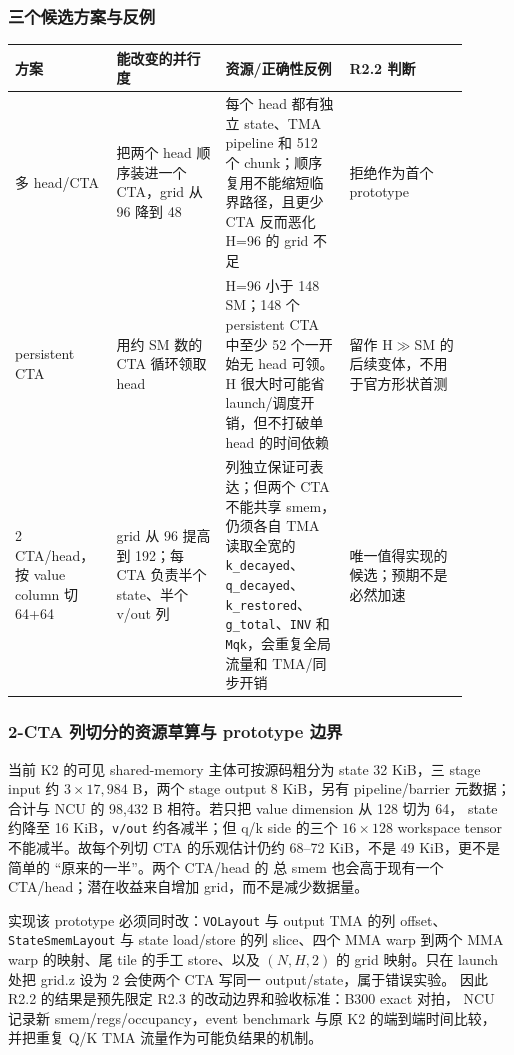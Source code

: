 \documentclass[11pt,a4paper,fontset=none]{ctexart}
\newcommand{\code}[1]{\texttt{#1}}
\begin{document}
\subsubsection{三个候选方案与反例}

\begin{longtable}{@{}L{0.19\linewidth}L{0.22\linewidth}L{0.25\linewidth}L{0.24\linewidth}@{}}
\toprule
方案 & 能改变的并行度 & 资源/正确性反例 & R2.2 判断 \\
\midrule
\endhead
\bottomrule
\endlastfoot
多 head/CTA & 把两个 head 顺序装进一个 CTA，grid 从 96 降到 48 & 每个 head 都有独立 state、TMA pipeline 和 512 个 chunk；顺序复用不能缩短临界路径，且更少 CTA 反而恶化 H=96 的 grid 不足 & 拒绝作为首个 prototype \\
persistent CTA & 用约 SM 数的 CTA 循环领取 head & H=96 小于 148 SM；148 个 persistent CTA 中至少 52 个一开始无 head 可领。H 很大时可能省 launch/调度开销，但不打破单 head 的时间依赖 & 留作 H\(\gg\)SM 的后续变体，不用于官方形状首测 \\
2 CTA/head，按 value column 切 64+64 & grid 从 96 提高到 192；每 CTA 负责半个 state、半个 v/out 列 & 列独立保证可表达；但两个 CTA 不能共享 smem，仍须各自 TMA 读取全宽的 \code{k\_decayed}、\code{q\_decayed}、\code{k\_restored}、\code{g\_total}、\code{INV} 和 \code{Mqk}，会重复全局流量和 TMA/同步开销 & 唯一值得实现的候选；预期不是必然加速 \\
\end{longtable}

\subsubsection{2-CTA 列切分的资源草算与 prototype 边界}

当前 K2 的可见 shared-memory 主体可按源码粗分为 state 32 KiB，三 stage input
约 \(3\times17{,}984\) B，两个 stage output 8 KiB，另有 pipeline/barrier
元数据；合计与 NCU 的 98,432 B 相符。若只把 value dimension 从 128 切为 64，
state 约降至 16 KiB，\code{v/out} 约各减半；但 q/k side 的三个
\(16\times128\) workspace tensor 不能减半。故每个列切 CTA 的乐观估计仍约
68--72 KiB，不是 49 KiB，更不是简单的 ``原来的一半''。两个 CTA/head 的
总 smem 也会高于现有一个 CTA/head；潜在收益来自增加 grid，而不是减少数据量。

实现该 prototype 必须同时改：\code{VOLayout} 与 output TMA 的列 offset、
\code{StateSmemLayout} 与 state load/store 的列 slice、四个 MMA warp 到两个
MMA warp 的映射、尾 tile 的手工 store、以及 \((N,H,2)\) 的 grid 映射。只在
launch 处把 grid.z 设为 2 会使两个 CTA 写同一 output/state，属于错误实验。
因此 R2.2 的结果是预先限定 R2.3 的改动边界和验收标准：B300 exact 对拍，
NCU 记录新 smem/regs/occupancy，event benchmark 与原 K2 的端到端时间比较，
并把重复 Q/K TMA 流量作为可能负结果的机制。
\end{document}
